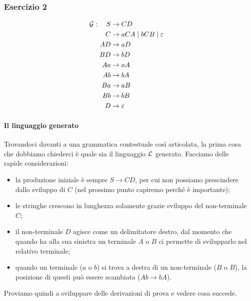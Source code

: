 \documentclass[class=book, crop=false, oneside, 12pt]{standalone}
\begin{document}
  \subsubsection{Esercizio 2}
  \begin{align*}
    \mathcal{G}: \quad S &\to CD \\
    C &\to aCA \mid bCB \mid \varepsilon \\
    AD &\to aD \\
    BD &\to bD \\ \notag
    Aa &\to aA \\
    Ab &\to bA \\ \notag
    Ba &\to aB \\ \notag
    Bb &\to bB \\ \notag
    D &\to \varepsilon \notag
  \end{align*}
  \paragraph{Il linguaggio generato}
  Trovandoci davanti a una grammatica contestuale così articolata, la prima cosa che dobbiamo chiederci è quale sia il linguaggio \(\mathcal{L}\) generato. Facciamo delle rapide considerazioni:
  \begin{itemize}
    \item la produzione iniziale è sempre \(S \to CD\), per cui non possiamo prescindere dallo sviluppo di \(C\) (nel prossimo punto capiremo perché è importante);
    \item le stringhe crescono in lunghezza solamente grazie sviluppo del non-terminale \(C\);
    \item il non-terminale \(D\) agisce come un delimitatore destro, dal momento che quando ha alla sua sinistra un terminale \(A\) o \(B\) ci permette di svilupparlo nel relativo terminale;
    \item quando un terminale (\(a\) o \(b\)) si trova a destra di un non-terminale (\(B\) o \(B\)), la posizione di questi può essere scambiata (\(Ab \to bA\)).
  \end{itemize}
  Proviamo quindi a sviluppare delle derivazioni di prova e vedere cosa succede.
\end{document}
